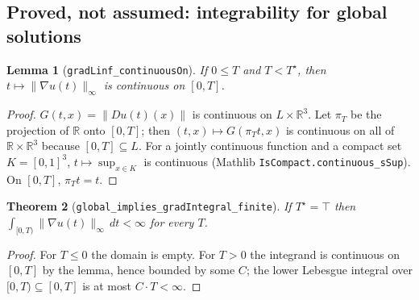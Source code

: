 \documentclass[11pt]{article}
\newtheorem{theorem}{Theorem}
\newtheorem{lemma}[theorem]{Lemma}
\theoremstyle{definition}
\newcommand{\R}{\mathbb{R}}
\newcommand{\Tstar}{T^\star}
\newcommand{\lean}[1]{\texttt{#1}}
\begin{document}
\subsection{Proved, not assumed: integrability for global solutions}
\begin{lemma}[\lean{gradLinf\_continuousOn}]
If $0\le T$ and $T<\Tstar$, then $t\mapsto\|\nabla u(t)\|_\infty$ is continuous on
$[0,T]$.
\end{lemma}
\begin{proof}
$G(t,x)=\|Du(t)(x)\|$ is continuous on $L\times\R^3$. Let $\pi_T$ be the projection of
$\R$ onto $[0,T]$; then $(t,x)\mapsto G(\pi_T t, x)$ is continuous on all of
$\R\times\R^3$ because $[0,T]\subseteq L$. For a jointly continuous function and a
compact set $K=[0,1]^3$, $t\mapsto\sup_{x\in K}$ is continuous (Mathlib
\lean{IsCompact.continuous\_sSup}). On $[0,T]$, $\pi_T t = t$.
\end{proof}
\begin{theorem}[\lean{global\_implies\_gradIntegral\_finite}]
If $\Tstar=\top$ then $\int_{[0,T)}\|\nabla u(t)\|_\infty\,dt<\infty$ for every $T$.
\end{theorem}
\begin{proof}
For $T\le 0$ the domain is empty. For $T>0$ the integrand is continuous on $[0,T]$ by
the lemma, hence bounded by some $C$; the lower Lebesgue integral over
$[0,T)\subseteq[0,T]$ is at most $C\cdot T<\infty$.
\end{proof}
\end{document}
